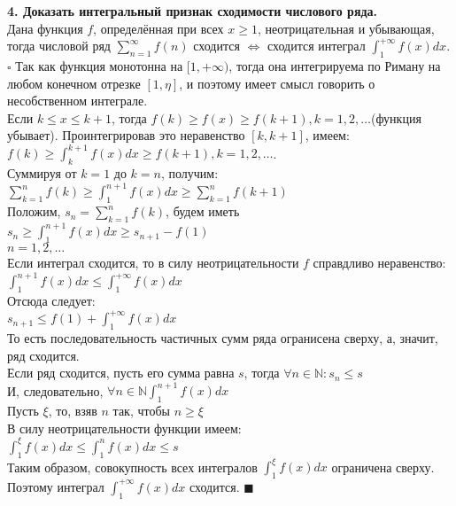 \documentclass[11pt,a4paper]{article}
\newcommand{\proof}{$\square$ }
\newcommand{\qed}{\hfill$\blacksquare$}
\begin{document}
\textbf{4. Доказать интегральный признак сходимости числового ряда.\\}
Дана функция $f$, определённая при всех $x \geq 1$, неотрицательная и убывающая, тогда числовой ряд $\sum_{n=1}^{\infty}{f(n)}$ сходится $\Leftrightarrow$ сходится интеграл $\int_{1}^{+\infty}{f(x)dx}$.
\\
\proof
Так как функция монотонна на $[1, +\infty)$, тогда она интегрируема по Риману на любом конечном отрезке $[1, \eta]$, и поэтому имеет смысл говорить о несобственном интеграле.
\\
Если $k \leq x \leq k + 1$, тогда $f(k) \geq f(x) \geq f(k + 1), k = 1, 2, \dots$(функция убывает). Проинтегрировав это неравенство $[k, k + 1]$, имеем:
\\
$f(k) \geq \int_{k}^{k + 1}{f(x)dx} \geq f(k + 1), k = 1, 2, \dots$.
\\
Суммируя от $k = 1$ до $k = n$, получим:
\\
$\sum_{k = 1}^{n}{f(k)} \geq \int_{1}^{n + 1}{f(x)dx} \geq \sum_{k = 1}^{n}{f(k + 1)}$
\\
Положим, $s_n = \sum_{k = 1}^{n}{f(k)}$, будем иметь
\\
$s_n \geq \int_{1}^{n + 1}{f(x)dx} \geq s_{n + 1} - f(1)$
\\
$n = 1, 2, \dots$
\\
Если интеграл сходится, то в силу неотрицательности $f$ справдливо неравенство:
\\
$\int_{1}^{n + 1}{f(x)dx} \leq \int_{1}^{+\infty}{f(x)dx}$
\\
Отсюда следует:
\\
$s_{n + 1} \leq f(1) + \int_{1}^{+\infty}{f(x)dx}$
\\
То есть последовательность частичных сумм ряда огранисена сверху, а, значит, ряд сходится.
\\
Если ряд сходится, пусть его сумма равна $s$, тогда $\forall n \in \mathbb{N}: s_n \leq s$
\\
И, следовательно, $\forall n \in \mathbb{N} \int_{1}^{n + 1}{f(x)dx}$
\\
Пусть $\xi$, то, взяв $n$ так, чтобы $n \geq \xi$
\\
В силу неотрицательности функции имеем:
\\
$\int_{1}^{\xi}{f(x)dx} \leq \int_{1}^{n}{f(x)dx} \leq s$
\\
Таким образом, совокупность всех интегралов $\int_{1}^{\xi}{f(x)dx}$ ограничена сверху.
\\
Поэтому интеграл $\int_{1}^{+\infty}{f(x)dx}$ сходится.
\qed
\end{document}
